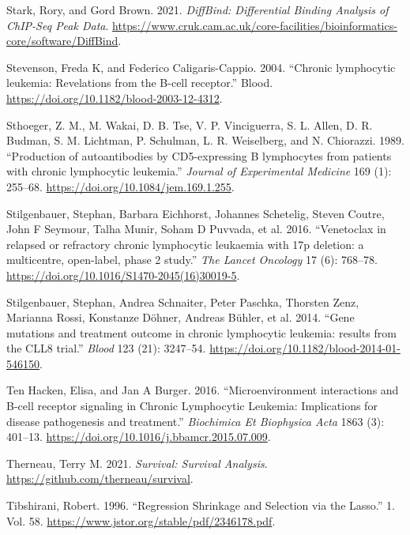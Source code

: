 \documentclass[11pt, a4paper, twosided]{book}
\newenvironment{CSLReferences}%
  {}%
  {\par}
\begin{document}
\begin{CSLReferences}{1}{0}
\leavevmode{}%
Stark, Rory, and Gord Brown. 2021. \emph{DiffBind: Differential Binding Analysis of ChIP-Seq Peak Data}. \url{https://www.cruk.cam.ac.uk/core-facilities/bioinformatics-core/software/DiffBind}.

\leavevmode{}%
Stevenson, Freda K, and Federico Caligaris-Cappio. 2004. {``{Chronic lymphocytic leukemia: Revelations from the B-cell receptor}.''} Blood. \url{https://doi.org/10.1182/blood-2003-12-4312}.

\leavevmode{}%
Sthoeger, Z. M., M. Wakai, D. B. Tse, V. P. Vinciguerra, S. L. Allen, D. R. Budman, S. M. Lichtman, P. Schulman, L. R. Weiselberg, and N. Chiorazzi. 1989. {``{Production of autoantibodies by CD5-expressing B lymphocytes from patients with chronic lymphocytic leukemia}.''} \emph{Journal of Experimental Medicine} 169 (1): 255--68. \url{https://doi.org/10.1084/jem.169.1.255}.

\leavevmode{}%
Stilgenbauer, Stephan, Barbara Eichhorst, Johannes Schetelig, Steven Coutre, John F Seymour, Talha Munir, Soham D Puvvada, et al. 2016. {``{Venetoclax in relapsed or refractory chronic lymphocytic leukaemia with 17p deletion: a multicentre, open-label, phase 2 study}.''} \emph{The Lancet Oncology} 17 (6): 768--78. \url{https://doi.org/10.1016/S1470-2045(16)30019-5}.

\leavevmode{}%
Stilgenbauer, Stephan, Andrea Schnaiter, Peter Paschka, Thorsten Zenz, Marianna Rossi, Konstanze Döhner, Andreas Bühler, et al. 2014. {``{Gene mutations and treatment outcome in chronic lymphocytic leukemia: results from the CLL8 trial.}''} \emph{Blood} 123 (21): 3247--54. \url{https://doi.org/10.1182/blood-2014-01-546150}.

\leavevmode{}%
Ten Hacken, Elisa, and Jan A Burger. 2016. {``{Microenvironment interactions and B-cell receptor signaling in Chronic Lymphocytic Leukemia: Implications for disease pathogenesis and treatment.}''} \emph{Biochimica Et Biophysica Acta} 1863 (3): 401--13. \url{https://doi.org/10.1016/j.bbamcr.2015.07.009}.

\leavevmode{}%
Therneau, Terry M. 2021. \emph{Survival: Survival Analysis}. \url{https://github.com/therneau/survival}.

\leavevmode{}%
Tibshirani, Robert. 1996. {``{Regression Shrinkage and Selection via the Lasso}.''} 1. Vol. 58. \url{https://www.jstor.org/stable/pdf/2346178.pdf}.


\end{CSLReferences}
\end{document}
